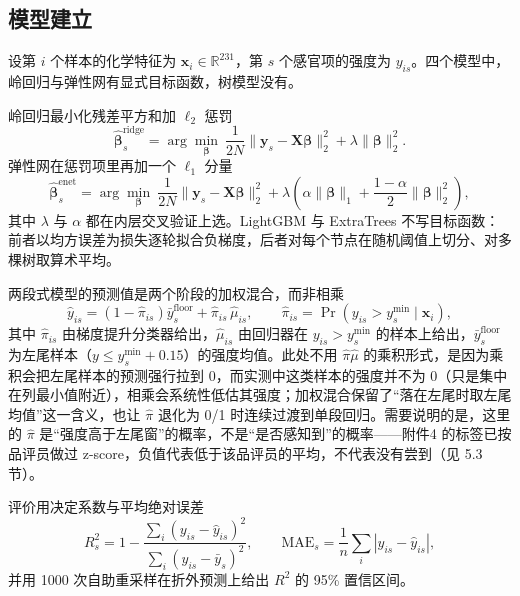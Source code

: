 \subsection{模型建立}

设第 $i$ 个样本的化学特征为 $\boldsymbol{x}_i\in\mathbb{R}^{231}$，第 $s$ 个感官项的强度为 $y_{is}$。四个模型中，岭回归与弹性网有显式目标函数，树模型没有。

岭回归最小化残差平方和加 $\ell_2$ 惩罚
\begin{equation}
  \hat{\boldsymbol\beta}^{\mathrm{ridge}}_s=\arg\min_{\boldsymbol\beta}\ \frac{1}{2N}\lVert \boldsymbol{y}_s-\boldsymbol{X}\boldsymbol\beta\rVert_2^2+\lambda\lVert\boldsymbol\beta\rVert_2^2 .
\end{equation}
弹性网在惩罚项里再加一个 $\ell_1$ 分量
\begin{equation}
  \hat{\boldsymbol\beta}^{\mathrm{enet}}_s=\arg\min_{\boldsymbol\beta}\ \frac{1}{2N}\lVert \boldsymbol{y}_s-\boldsymbol{X}\boldsymbol\beta\rVert_2^2
  +\lambda\left(\alpha\lVert\boldsymbol\beta\rVert_1+\frac{1-\alpha}{2}\lVert\boldsymbol\beta\rVert_2^2\right),
\end{equation}
其中 $\lambda$ 与 $\alpha$ 都在内层交叉验证上选。LightGBM 与 ExtraTrees 不写目标函数：前者以均方误差为损失逐轮拟合负梯度，后者对每个节点在随机阈值上切分、对多棵树取算术平均。

两段式模型的预测值是两个阶段的加权混合，而非相乘
\begin{equation}
  \hat y_{is}=\left(1-\hat\pi_{is}\right)\bar y_s^{\text{floor}}+\hat\pi_{is}\,\hat\mu_{is},\qquad
  \hat\pi_{is}=\Pr\left(y_{is}>y_s^{\min}\mid \boldsymbol{x}_i\right),
\end{equation}
其中 $\hat\pi_{is}$ 由梯度提升分类器给出，$\hat\mu_{is}$ 由回归器在 $y_{is}>y_s^{\min}$ 的样本上给出，$\bar y_s^{\text{floor}}$ 为左尾样本（$y\le y_s^{\min}+0.15$）的强度均值。此处不用 $\hat\pi\hat\mu$ 的乘积形式，是因为乘积会把左尾样本的预测强行拉到 0，而实测中这类样本的强度并不为 0（只是集中在列最小值附近），相乘会系统性低估其强度；加权混合保留了“落在左尾时取左尾均值”这一含义，也让 $\hat\pi$ 退化为 0/1 时连续过渡到单段回归。需要说明的是，这里的 $\hat\pi$ 是“强度高于左尾窗”的概率，不是“是否感知到”的概率——附件4 的标签已按品评员做过 z-score，负值代表低于该品评员的平均，不代表没有尝到（见 5.3 节）。

评价用决定系数与平均绝对误差
\begin{equation}
  R^2_s=1-\frac{\sum_i\left(y_{is}-\hat y_{is}\right)^2}{\sum_i\left(y_{is}-\bar y_s\right)^2},
  \qquad
  \mathrm{MAE}_s=\frac{1}{n}\sum_i\left|y_{is}-\hat y_{is}\right|,
\end{equation}
并用 1000 次自助重采样在折外预测上给出 $R^2$ 的 95\% 置信区间。

